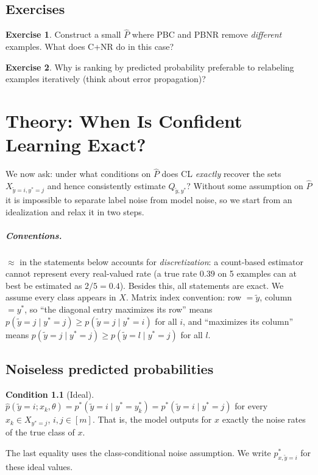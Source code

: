 \documentclass[11pt,a4paper]{report}
\newcommand{\1}{\mathbf 1}
\theoremstyle{definition}
\newtheorem{condition}[definition]{Condition}
\newtheorem{exercise}{Exercise}[chapter]
\theoremstyle{plain}
\theoremstyle{remark}
\begin{document}
\section*{Exercises}
\begin{exercise}
Construct a small $\hat P$ where PBC and PBNR remove \emph{different} examples. What does C+NR do in this case?
\end{exercise}
\begin{exercise}
Why is ranking by predicted probability preferable to relabeling examples iteratively (think about error propagation)?
\end{exercise}

\chapter{Theory: When Is Confident Learning Exact?}

We now ask: under what conditions on $\hat P$ does CL \emph{exactly} recover the sets $X_{\tilde y=i,y^*=j}$ and hence consistently estimate $Q_{\tilde y,y^*}$? Without some assumption on $\hat P$ it is impossible to separate label noise from model noise, so we start from an idealization and relax it in two steps.

\paragraph{Conventions.} $\approx$ in the statements below accounts for \emph{discretization}: a count-based estimator cannot represent every real-valued rate (a true rate $0.39$ on 5 examples can at best be estimated as $2/5=0.4$). Besides this, all statements are exact. We assume every class appears in $X$. Matrix index convention: row $=\tilde y$, column $=y^*$, so ``the diagonal entry maximizes its row'' means $p(\tilde y=j\mid y^*=j)\ge p(\tilde y=j\mid y^*=i)$ for all $i$, and ``maximizes its column'' means $p(\tilde y=j\mid y^*=j)\ge p(\tilde y=l\mid y^*=j)$ for all $l$.

\section{Noiseless predicted probabilities}
\begin{condition}[Ideal]\label{cond:ideal}
$\hat p(\tilde y=i;x_k,\theta)=p^*(\tilde y=i\mid y^*=y^*_k)=p^*(\tilde y=i\mid y^*=j)$ for every $x_k\in X_{y^*=j}$, $i,j\in[m]$. That is, the model outputs for $x$ exactly the noise rates of the true class of $x$.
\end{condition}
The last equality uses the class-conditional noise assumption. We write $p^*_{x,\tilde y=i}$ for these ideal values.
\end{document}
